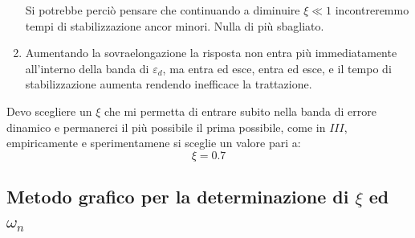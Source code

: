 \documentclass[a4paper, 15pt]{article}
\begin{document}
\begin{adjustwidth}{2in}{}
\begin{enumerate}[label=\Roman*.]
	Si potrebbe perciò pensare che continuando a diminuire $\xi\ll1$ incontreremmo tempi di stabilizzazione ancor minori. Nulla di più sbagliato. 
	
	\item Aumentando la sovraelongazione la risposta non entra più immediatamente all'interno della banda di $\varepsilon_d$, ma entra ed esce, entra ed esce, e il tempo di stabilizzazione aumenta rendendo inefficace la trattazione.
	\end{enumerate}  
	
	Devo scegliere un $\xi$ che mi permetta di entrare subito nella banda di errore dinamico e permanerci il più possibile il prima possibile, come in $III$, empiricamente e sperimentamene si sceglie un valore pari a: 
	\[\xi = 0.7\]
\end{adjustwidth}
\newpage
\subsection{Metodo grafico per la determinazione di $\xi$ ed $\omega_n$} 
\end{document}
